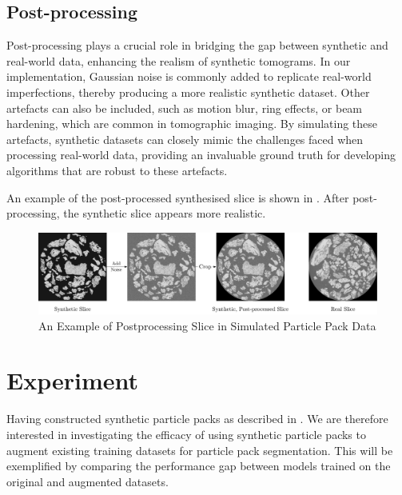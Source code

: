 \documentclass[preprint,12pt]{elsarticle}
\begin{document}
\subsection{Post-processing}
Post-processing plays a crucial role in bridging the gap between synthetic and real-world data, enhancing the realism of synthetic tomograms. 
In our implementation, Gaussian noise is commonly added to replicate real-world imperfections, thereby producing a more realistic synthetic dataset.
Other artefacts can also be included, such as motion blur, ring effects, or beam hardening, which are common in tomographic imaging. 
By simulating these artefacts, synthetic datasets can closely mimic the challenges faced when processing real-world data, providing an invaluable ground truth for developing algorithms that are robust to these artefacts.
\par
An example of the post-processed synthesised slice is shown in . 
After post-processing, the synthetic slice appears more realistic.
\begin{figure}[H]
    \includegraphics[width=\textwidth]{figures/pdf/postprocess.pdf}
    \caption{An Example of Postprocessing Slice in Simulated Particle Pack Data}
    \label{fig:syn:postprocess}
\end{figure}

\section{Experiment}
Having constructed synthetic particle packs as described in . 
We are therefore interested in investigating the efficacy of using synthetic particle packs to augment existing training datasets for particle pack segmentation.
This will be exemplified by comparing the performance gap between models trained on the original and augmented datasets.
\end{document}
